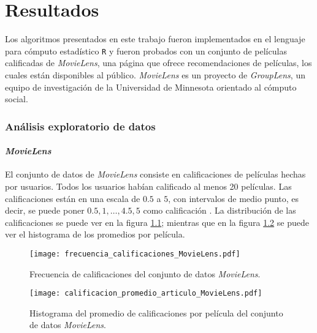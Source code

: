 
\chapter{Resultados}

Los algoritmos presentados en este trabajo fueron implementados en el lenguaje para cómputo estadístico \texttt{R} y fueron probados con un conjunto de películas calificadas de \textit{MovieLens}, una página que ofrece recomendaciones de películas, los cuales están disponibles al público. \textit{MovieLens} es un proyecto de \textit{GroupLens}, un equipo de investigación de la Universidad de Minnesota orientado al cómputo social.

\subsection{Análisis exploratorio de datos}

\subsubsection{\textit{MovieLens}}

El conjunto de datos de \textit{MovieLens} consiste en  calificaciones de  películas hechas por  usuarios. Todos los usuarios habían calificado al menos 20 películas. Las calificaciones están en una escala de $0.5$ a $5$, con intervalos de medio punto, es decir, se puede poner $0.5, 1, \hdots, 4.5, 5$ como calificación \cite{harper2016movielens}. La distribución de las calificaciones se puede ver en la figura \ref{fig:ML_frec_calificaciones}; mientras que en la figura \ref{fig:ML_hist_prom_cals} se puede ver el histograma de los promedios por película.

\begin{figure}[H]
	\centering
 	\texttt{[image: frecuencia\_calificaciones\_MovieLens.pdf]}
 	\caption{Frecuencia de calificaciones del conjunto de datos \textit{MovieLens}.}
 	\label{fig:ML_frec_calificaciones}
\end{figure}

\begin{figure}[H]
	\centering
 	\texttt{[image: calificacion\_promedio\_articulo\_MovieLens.pdf]}
 	\caption{Histograma del promedio de calificaciones por película del conjunto de datos \textit{MovieLens}.}
 	\label{fig:ML_hist_prom_cals}
\end{figure}

